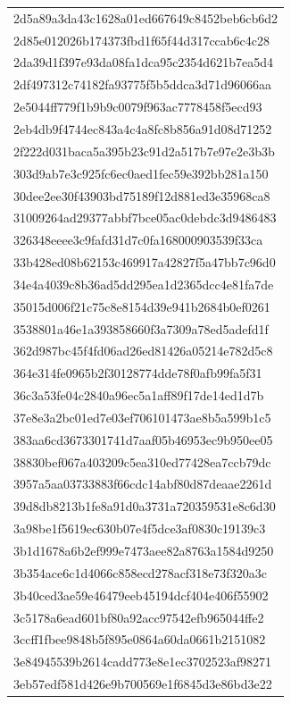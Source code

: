 \begin{tabular}{l}
2d5a89a3da43c1628a01ed667649c8452beb6cb6d2 \\
2d85e012026b174373fbd1f65f44d317ccab6c4c28 \\
2da39d1f397e93da08fa1dca95c2354d621b7ea5d4 \\
2df497312c74182fa93775f5b5ddca3d71d96066aa \\
2e5044ff779f1b9b9c0079f963ac7778458f5ecd93 \\
2eb4db9f4744ec843a4c4a8fc8b856a91d08d71252 \\
2f222d031baca5a395b23c91d2a517b7e97e2e3b3b \\
303d9ab7e3c925fc6ec0aed1fec59e392bb281a150 \\
30dee2ee30f43903bd75189f12d881ed3e35968ca8 \\
31009264ad29377abbf7bce05ac0debdc3d9486483 \\
326348eeee3c9fafd31d7c0fa168000903539f33ca \\
33b428ed08b62153c469917a42827f5a47bb7c96d0 \\
34e4a4039c8b36ad5dd295ea1d2365dcc4e81fa7de \\
35015d006f21c75c8e8154d39e941b2684b0ef0261 \\
3538801a46e1a393858660f3a7309a78ed5adefd1f \\
362d987bc45f4fd06ad26ed81426a05214e782d5c8 \\
364e314fe0965b2f30128774dde78f0afb99fa5f31 \\
36c3a53fe04c2840a96ec5a1aff89f17de14ed1d7b \\
37e8e3a2bc01ed7e03ef706101473ae8b5a599b1c5 \\
383aa6cd3673301741d7aaf05b46953ec9b950ee05 \\
38830bef067a403209c5ea310ed77428ea7ccb79dc \\
3957a5aa03733883f66cdc14abf80d87deaae2261d \\
39d8db8213b1fe8a91d0a3731a720359531e8c6d30 \\
3a98be1f5619ec630b07e4f5dce3af0830c19139c3 \\
3b1d1678a6b2ef999e7473aee82a8763a1584d9250 \\
3b354ace6c1d4066c858ecd278acf318e73f320a3c \\
3b40ced3ae59e46479eeb45194dcf404e406f55902 \\
3c5178a6ead601bf80a92acc97542efb965044ffe2 \\
3ccff1fbee9848b5f895e0864a60da0661b2151082 \\
3e84945539b2614cadd773e8e1ec3702523af98271 \\
3eb57edf581d426e9b700569e1f6845d3e86bd3e22 \\

\end{tabular}
